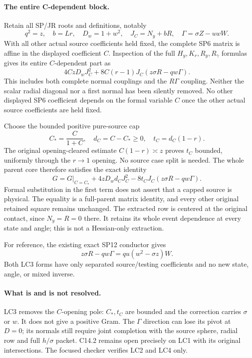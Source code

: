 \paragraph{The entire C-dependent block.}
Retain all SP/JR roots and definitions, notably
\[
 q^2=z,\quad b=Lr,\quad D_w=1+w^2,\quad
 J_C=N_y+bR,\quad\Gamma=\sigma Z-uwW.
\]
With all other actual source coefficients held fixed, the complete
SP6 matrix is affine in the displayed coefficient $C$.  Inspection
of the full $H_y,K_r,R_y,R_\gamma$ formulas gives its entire
$C$-dependent part as
\[
 4CzD_wJ_C^2
       +8C(r-1)J_C(z\sigma R-qw\Gamma).            \tag{LC2}
\]
This includes both complete normal couplings and the $R\Gamma$
coupling.  Neither the scalar radial diagonal nor a first normal has
been silently removed.  No other displayed SP6 coefficient depends
on the formal variable $C$ once the other actual source coefficients
are held fixed.

Choose the bounded positive pure-source cap
\[
 C_*=\frac C{1+C},\quad d_C=C-C_*\ge0,
 \quad t_C=d_C(1-r).
\]
The original opening-cleared estimate $C(1-r)\asymp z$ proves
$t_C$ bounded, uniformly through the $r\to1$ opening.  No source
case split is needed.  The whole parent core therefore satisfies
the exact identity
\[
 \boxed{\quad
 G=G\big|_{C=C_*}+4zD_wd_CJ_C^2
              -8t_CJ_C(z\sigma R-qw\Gamma).
 \quad}                                                       \tag{LC3}
\]
Formal substitution in the first term does not assert that a capped
source is physical.  The equality is a full-parent matrix identity,
and every other original retained square remains unchanged.
The extracted row is centered at the original contact, since
$N_y=R=0$ there.  It retains its whole event dependence at every
state and angle; this is not a Hessian-only extraction.

For reference, the existing exact SP12 conductor gives
\[
 z\sigma R-qw\Gamma=qu(w^2-\sigma z)W.             \tag{LC4}
\]
Both LC3 forms have only separated source/testing coefficients and
no new state, angle, or mixed inverse.

\paragraph{What is and is not resolved.}
LC3 removes the $C$-opening pole: $C_*,t_C$ are bounded and the
correction carries $\sigma$ or $w$. It does not give a positive Gram.
The $\Gamma$ direction can lose its pivot at $D=0$; its normals still
require joint completion with the source sphere, radial row and full
$h/\sigma$ packet. C14.2 remains open precisely on LC1 with its original
intersections. The focused checker verifies LC2 and LC4 only.
